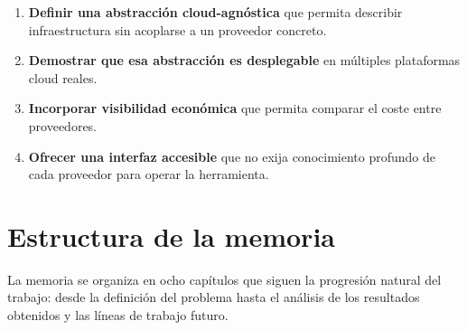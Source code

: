 \begin{enumerate}
    \item \textbf{Definir una abstracción cloud-agnóstica} que permita describir
    infraestructura sin acoplarse a un proveedor concreto.

    \item \textbf{Demostrar que esa abstracción es desplegable} en múltiples
    plataformas cloud reales.

    \item \textbf{Incorporar visibilidad económica} que permita comparar el coste
    entre proveedores.

    \item \textbf{Ofrecer una interfaz accesible} que no exija conocimiento
    profundo de cada proveedor para operar la herramienta.
\end{enumerate}

\section{Estructura de la memoria}

La memoria se organiza en ocho capítulos que siguen la progresión natural del
trabajo: desde la definición del problema hasta el análisis de los resultados
obtenidos y las líneas de trabajo futuro.

